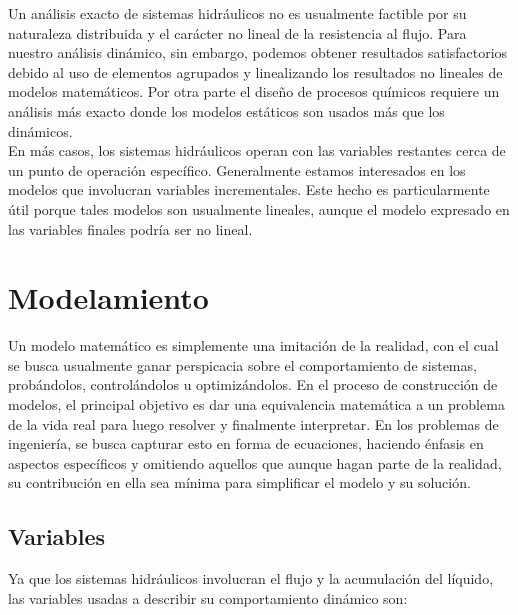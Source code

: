 \documentclass[a4paper,12pt,twoside]{proyectotanquesecci}
\begin{document}
Un análisis exacto de sistemas hidráulicos no es usualmente factible por su naturaleza distribuida y el carácter no lineal de la resistencia al flujo. Para nuestro análisis dinámico, sin embargo, podemos obtener resultados satisfactorios debido al uso de elementos agrupados y linealizando los resultados no lineales de modelos matemáticos. Por otra parte el diseño de procesos químicos requiere un análisis más exacto donde los modelos estáticos son usados más que los dinámicos.\\

En más casos, los sistemas hidráulicos operan con las variables restantes cerca de un punto de operación específico. Generalmente estamos interesados en los modelos que involucran variables incrementales. Este hecho es particularmente útil porque tales modelos son usualmente lineales, aunque el modelo expresado en las variables finales podría ser no lineal.\\

\newpage







\section{Modelamiento}

Un modelo matemático es simplemente una imitación de la realidad, con el cual se busca usualmente ganar perspicacia sobre el comportamiento de sistemas, probándolos, controlándolos u optimizándolos. En el proceso de construcción de modelos, el principal objetivo es dar una equivalencia matemática a un problema de la vida real para luego resolver y finalmente interpretar. En los problemas de ingeniería, se busca capturar esto en forma de ecuaciones, haciendo énfasis en aspectos específicos y omitiendo aquellos que aunque hagan parte de la realidad, su contribución en ella sea mínima para simplificar el modelo y su solución. \\

\subsection{Variables}

Ya que los sistemas hidráulicos involucran el flujo  y la acumulación del líquido, las variables usadas a describir su comportamiento dinámico son:\\
\end{document}
